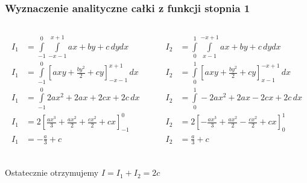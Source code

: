 \documentclass[9pt]{beamer}
\begin{document}
    \begin{frame}
        \frametitle{Wyznaczenie analityczne całki z funkcji stopnia 1}
        \begin{columns}
            \begin{column}{0.6\textwidth}
                \begin{align*}
                    I_1 &= \int\limits_{-1}^{0}\int\limits_{-x-1}^{x+1} ax+by+c \,dydx \\
                    I_1 &= \int\limits_{-1}^{0}\left[axy + \frac{by^2}{2} + cy\right]_{-x-1}^{x+1} \,dx \\
                    I_1 &= \int\limits_{-1}^{0} 2ax^2 + 2ax + 2cx + 2c \,dx \\
                    I_1 &= 2\left[ \frac{ax^3}{3} + \frac{ax^2}{2} + \frac{cx^2}{2} + cx \right]_{-1}^{0} \\
                    I_1 &= -\frac{a}{3} + c \\
                \end{align*}
            \end{column}
            \begin{column}{0.6\textwidth}
                \begin{align*}
                    I_2 &= \int\limits_{0}^{1}\int\limits_{x-1}^{-x+1} ax+by+c \,dydx \\
                    I_2 &= \int\limits_{0}^{1}\left[axy + \frac{by^2}{2} + cy\right]_{x-1}^{-x+1} \,dx \\
                    I_2 &= \int\limits_{0}^{1} - 2ax^2 + 2ax - 2cx + 2c \,dx \\
                    I_2 &= 2\left[ -\frac{ax^3}{3} + \frac{ax^2}{2} - \frac{cx^2}{2} + cx \right]_{0}^{1} \\
                    I_2 &= \frac{a}{3} + c \\
                \end{align*}
            \end{column}
        \end{columns}

        \begin{center}
            Ostatecznie otrzymujemy $ I = I_1 + I_2 = 2c $
        \end{center}
    \end{frame}
\end{document}
